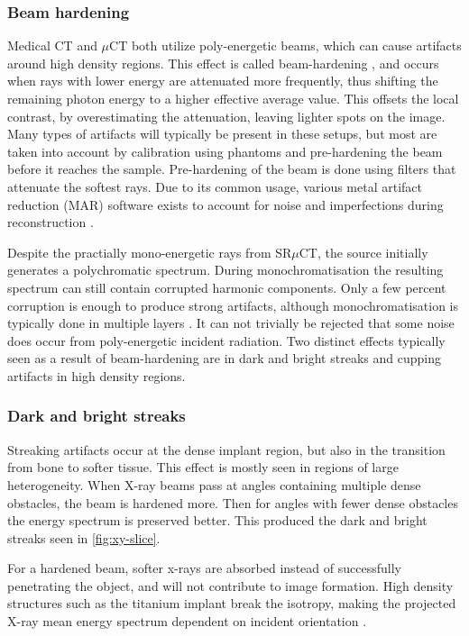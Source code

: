 \subsubsection{Beam hardening}\label{sec:beam-hardening}

Medical CT and $\mu$CT both utilize poly-energetic beams, which can cause artifacts around high
density regions. This effect is called beam-hardening \citep{beamhardening}, and occurs when rays
with lower energy are attenuated more frequently, thus shifting the remaining photon energy to a
higher effective average value. This offsets the local contrast, by overestimating the attenuation,
leaving lighter spots on the image. Many types of artifacts will typically be present in these
setups, but most are taken into account by calibration using phantoms and pre-hardening the beam
before it reaches the sample. Pre-hardening of the beam is done using filters that attenuate the
softest rays. Due to its common usage, various metal artifact reduction (MAR) software exists to
account for noise and imperfections during reconstruction \citep{mar1}\citep{mar2}.

Despite the practially mono-energetic rays from SR$\mu$CT, the source initially generates a
polychromatic spectrum. During monochromatisation the resulting spectrum can still contain
corrupted harmonic components. Only a few percent corruption is enough to produce strong
artifacts, although monochromatisation is typically done in multiple layers \citep{srnoise}.
It can not trivially be rejected that some noise does occur from poly-energetic incident radiation.
Two distinct effects typically seen as a result of beam-hardening are in dark and bright streaks
and cupping artifacts in high density regions.

\subsubsection{Dark and bright streaks}

Streaking artifacts occur at the dense implant region, but also in the transition from bone to softer
tissue. This effect is mostly seen in regions of large heterogeneity. When X-ray beams pass at angles
containing multiple dense obstacles, the beam is hardened more. Then for angles with fewer dense
obstacles the energy spectrum is preserved better. This produced the dark and bright streaks seen in
\cref{fig:xy-slice}.

For a hardened beam, softer x-rays are absorbed instead of successfully penetrating the object,
and will not contribute to image formation. High density structures such as the titanium implant
break the isotropy, making the projected X-ray mean energy spectrum dependent on incident orientation
\citep{srnoise}.

